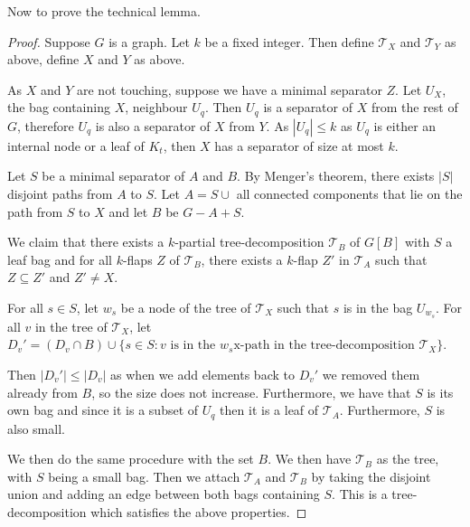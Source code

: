 \documentclass[]{article}
\newcommand{\tree}{\mathcal{T}}
\theoremstyle{definition}
\numberwithin{theorem}{section}
\numberwithin{equation}{section}
\begin{document}
Now to prove the technical lemma.

\begin{proof}
	Suppose $G$ is a graph. Let $k$ be a fixed integer. Then define $\tree_X$ and $\tree_Y$ as above, define $X$ and $Y$ as above.
	
	As $X$ and $Y$ are not touching, suppose we have a minimal separator $Z$. Let $U_X$, the bag containing $X$, neighbour $U_q$. Then $U_q$ is a separator of $X$ from the rest of $G$, therefore $U_q$ is also a separator of $X$ from $Y$. As $|U_q| \leq k$ as $U_q$ is either an internal node or a leaf of $K_t$, then $X$ has a separator of size at most $k$. 
	
	Let $S$ be a minimal separator of $A$ and $B$. By Menger's theorem, there exists $|S|$ disjoint paths from $A$ to $S$. Let $A = S \cup$ all connected components that lie on the path from $S$ to $X$ and let $B$ be $G - A + S$. 
	
	We claim that there exists a $k$-partial tree-decomposition $\tree_B$ of $G[B]$ with $S$ a leaf bag and for all $k$-flaps $Z$ of $\tree_B$, there exists a $k$-flap $Z'$ in $\tree_A$ such that $Z \subseteq Z'$ and $Z' \neq X$. 
	
	For all $s \in S$, let $w_s$ be a node of the tree of $\tree_X$ such that $s$ is in the bag $U_{w_s}$. 
	For all $v$ in the tree of $\tree_X$, let $D_v' = (D_v \cap B) \cup \lbrace s \in S : v \text{ is in the } w_s \text{x-path in the tree-decomposition } \tree_X \rbrace$. 
	
	Then $|D_v'| \leq |D_v|$ as when we add elements back to $D_v'$ we removed them already from $B$, so the size does not increase.
	Furthermore, we have that $S$ is its own bag and since it is a subset of $U_q$ then it is a leaf of $\tree_A$. Furthermore, $S$ is also small.
	
	We then do the same procedure with the set $B$. We then have $\tree_B$ as the tree, with $S$ being a small bag. Then we attach $\tree_A$ and $\tree_B$ by taking the disjoint union and adding an edge between both bags containing $S$. This is a tree-decomposition which satisfies the above properties. 
\end{proof}
\end{document}
